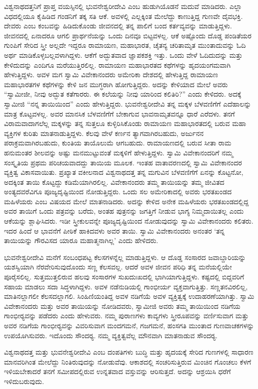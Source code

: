 ವಿಶ್ವನಾಥದತ್ತನಿಗೆ ಪ್ರಾಪ್ತ ವಯಸ್ಸಿನಲ್ಲಿ ಭುವನೇಶ್ವರೀದೇವಿ ಎಂಬ ಹುಡುಗಿಯೊಡನೆ ಮದುವೆ ಮಾಡಿದರು. ಎಲ್ಲಾ ವಿಧದಲ್ಲಿಯೂ ಕೈಹಿಡಿದ ಗಂಡನಿಗೆ ತಕ್ಕ ಸತಿ ಆಕೆ. ಅವಳಲ್ಲಿ ಎಲ್ಲಕ್ಕಿಂತ ಮೇಲೆದ್ದು ಕಾಣುತ್ತಿದ್ದ ಗುಣವೇ ದೈವಭಕ್ತಿ. ದೇವರು ಎಂಬ ಕಂಬವನ್ನು ಹಿಡಿದುಕೊಂಡು ಜೀವನದಲ್ಲಿ ತನ್ನ ಪಾಲಿಗೆ ಬಂದ ಕರ್ತವ್ಯವನ್ನು ಮಾಡುತ್ತಿದ್ದಳು. ಜೀವನದಲ್ಲಿ ಏನಾದರೂ ಆಗಲಿ ಪ್ರಾರ್ಥನೆಯನ್ನು ಒಂದು ದಿನವೂ ಬಿಟ್ಟವಳಲ್ಲ. ಆಕೆ ಅಷ್ಟೊಂದು ದೊಡ್ಡ ಪಂಡಿತೆಯರ ಗುಂಪಿಗೆ ಸೇರಿದ ಸ್ತ್ರೀ ಅಲ್ಲದೇ ಇದ್ದರೂ ರಾಮಾಯಣ, ಮಹಾಭಾರತ, ಚೈತನ್ಯ ಚರಿತಾಮೃತ ಮುಂತಾದುವನ್ನು ಓದಿ ಅರ್ಥ ಮಾಡಿಕೊಳ್ಳಬಲ್ಲವಳಾಗಿದ್ದಳು. ಆಕೆಗೆ ಅದ್ಭುತವಾದ ಜ್ಞಾಪಕಶಕ್ತಿ ಇತ್ತು. ಒಂದು ವೇಳೆ ಓದಿದುದನ್ನು ಮತ್ತು ಕೇಳಿದುದನ್ನು ಎಂದಿಗೂ ಮರೆಯುತ್ತಿರಲಿಲ್ಲ. ರಾಮಾಯಣ ಮಹಾಭಾರತದ ಕಥೆಗಳನ್ನು ಹೃದಯಂಗಮವಾಗಿ ಹೇಳುತ್ತಿದ್ದಳು. ಅವಳ ಮಗ ಸ್ವಾಮಿ ವಿವೇಕಾನಂದರು ಅಮೇರಿಕಾ ದೇಶದಲ್ಲಿ ಹೇಳುತ್ತಿದ್ದ ರಾಮಾಯಣ ಮಹಾಭಾರತಗಳ ಕಥೆಗಳನ್ನು ಕೇಳಿ ಜನ ಮುಗ್ಧರಾಗಿ ಹೋಗುತ್ತಿದ್ದರು. ಅದನ್ನು ಕೇಳಿಯಾದ ಮೇಲೆ ಅವರು “ಸ್ವಾಮೀಜೀ, ನೀವು ಅದ್ಭುತ ಕತೆಗಾರರು. ಈ ಕಲೆಯನ್ನು ನೀವು ಯಾರಿಂದ ಕಲಿತಿರಿ?” ಎಂದು ಕೇಳಿದರು. ಅದಕ್ಕೆ ಸ್ವಾಮೀಜಿ “ನನ್ನ ತಾಯಿಯಿಂದ” ಎಂದು ಹೇಳುತ್ತಿದ್ದರು. ಭುವನೇಶ್ವರೀದೇವಿ ತನ್ನ ಮಕ್ಕಳ ಬೆಳವಣಿಗೆಗೆ ಎದೆಹಾಲನ್ನು ಮಾತ್ರ ಕೊಟ್ಟವಳಲ್ಲ. ಅವರ ಮಾನಸಿಕ ಬೆಳವಣಿಗೆಗೆ ಬೇಕಾಗುವ ಭಾವನಾಮೃತವನ್ನೂ ಧಾರೆ ಎರೆದಳು. ತನಗೆ ವಿರಾಮವಾದಾಗಲೆಲ್ಲ ಮಕ್ಕಳನ್ನು ತನ್ನ ಸುತ್ತಲೂ ಕುಳ್ಳಿರಿಸಿಕೊಂಡು ರಾಮಾಯಣ ಮಹಾಭಾರತದಲ್ಲಿ ಬರುವ ಮಹಾ ವ್ಯಕ್ತಿಗಳ ಕುರಿತು ಮಾತನಾಡುತ್ತಿದ್ದಳು. ಕೆಲವು ವೇಳೆ ಕರ್ಣನ ತ್ಯಾಗವಾಗಿರಬಹುದು, ಅರ್ಜುನನ ಪರಾಕ್ರಮವಾಗಿರಬಹುದು, ಕುಂತಿಯ ತಾಯೊಲುಮೆ ಆಗಬಹುದು. ರಾಮಾಯಣದಲ್ಲಿ ಬರುವ ಸೀತಾ ರಾಮ ಹನುಮಂತರ ಶೀಲವನ್ನು ಅಷ್ಟು ಮನಮುಟ್ಟುವಂತೆ ಮಕ್ಕಳಿಗೆ ಹೇಳುತ್ತಿದ್ದಳು. ಸ್ವಾಮಿ ವಿವೇಕಾನಂದರಿಗೆ ನಮ್ಮ ಸಂಸ್ಕೃತಿಯ ಪ್ರಥಮ ಪರಿಚಯವಾದದ್ದು ತಾಯಿಯ ಮೂಲಕ. ಇಂತಹ ವಾತಾವರಣದಲ್ಲಿ ಸ್ವಾಮಿ ವಿವೇಕಾನಂದರ ವ್ಯಕ್ತಿತ್ವ ವಿಕಾಸವಾಯಿತು. ಪ್ರಖ್ಯಾತ ವಕೀಲನಾದ ವಿಶ್ವನಾಥದತ್ತ ತನ್ನ ಮಗುವಿನ ಬೆಳವಣಿಗೆಗೆ ಏನನ್ನು ಕೊಟ್ಟನೋ, ಅದಕ್ಕಿಂತ ತಾಯಿ ಕೊಟ್ಟದ್ದು ಕಡಿಮೆಯಾಗಿರಲಿಲ್ಲ. ವಿವೇಕಾನಂದರು ತಮ್ಮ ತಾಯಿಯನ್ನು ತಮ್ಮ ಜೀವಿತದ ಅಂತ್ಯದವರೆವಿಗೂ ಪೂಜ್ಯದೃಷ್ಟಿಯಿಂದ ನೋಡುತ್ತಿದ್ದರು. ಒಂದು ಸಲ ಅಮೇರಿಕಾದಲ್ಲಿ ಅವರು ಭರತಖಂಡದ ಮಹಿಳೆಯರು ಎಂಬ ವಿಷಯದ ಮೇಲೆ ಮಾತನಾಡಿದರು. ಅದನ್ನು ಕೇಳಿದ ಅನೇಕ ಮಹಿಳೆಯರು ಭರತಖಂಡದಲ್ಲಿದ್ದ ಅವರ ತಾಯಿಗೆ ಒಂದು ಪತ್ರವನ್ನು ಬರೆದು, ಅಂತಹ ಪುತ್ರನನ್ನು ಜಗತ್ತಿಗೆ ನೀಡುವ ಭಾಗ್ಯ ನಿಮ್ಮದಾಯಿತಲ್ಲ ಎಂದು ಆಕೆಯನ್ನು ಶ್ಲಾಘಿಸಿದರು. ಇಡೀ ಸ್ತ್ರೀಕುಲವನ್ನೇ ಪೂಜ್ಯದೃಷ್ಟಿಯಿಂದ ನೋಡುವುದನ್ನು ಸ್ವಾಮಿ ವಿವೇಕಾನಂದರು ಕಲಿತರು. ಇದರ ಹಿಂದೆ ಆ ಭಾವನೆಗೆ ಪೀಠಿಕೆ ಹಾಕಿದವಳು ಅವರ ತಾಯಿ. ಸ್ವಾಮಿ ವಿವೇಕಾನಂದರು ಅನಂತರ ‘ತನ್ನ ತಾಯಿಯನ್ನು ಗೌರವಿಸದ ಯಾರೂ ಮಹಾತ್ಮನಾಗಿಲ್ಲ’ ಎಂದು ಹೇಳಿದರು.

ಭುವನೇಶ್ವರೀದೇವಿ ಮನೆಗೆ ಸಂಬಂಧಪಟ್ಟ ಕೆಲಸಗಳನ್ನೆಲ್ಲ ಮಾಡುತ್ತಿದ್ದಳು. ಆ ದೊಡ್ಡ ಸಂಸಾರದ ಜವಾಬ್ದಾರಿಯನ್ನು ಯಶಸ್ವಿಯಾಗಿ ನೆರವೇರಿಸುವುದೊಂದು ಸಣ್ಣ ಕೆಲಸವಲ್ಲ. ಆದರೆ ಅವಳ ಜೀವನ ಪರಿಧಿ ತನ್ನ ಮನೆಯಲ್ಲಿಯೇ ಪೂರೈಸಲಿಲ್ಲ. ಸುತ್ತಮುತ್ತಲಿರುವ ಹಲವು ಸಂಸಾರಗಳ ಸುಖದುಃಖದಲ್ಲಿ ಭಾಗಿಯಾಗುತ್ತಿದ್ದಳು. ಕಷ್ಟದಲ್ಲಿ ಬಿದ್ದವರಿಗೆ ಸಹಾಯ ಮಾಡಲು ಸದಾ ಸಿದ್ಧಳಾಗಿದ್ದಳು. ಅವಳ ನಡೆನುಡಿಯಲ್ಲಿ ಗಾಂಭೀರ್ಯ ವ್ಯಕ್ತವಾಗುತ್ತಿತ್ತು. ಸಣ್ಣತನವಿರಲಿಲ್ಲ, ಮಾತಿನಲ್ಲಾಗಲೀ ಕೆಲಸದಲ್ಲಾಗಲಿ. ಸಿಂಹಿಣಿಯಂತಿದ್ದ ಅವಳ ನಡಿಗೆಯೆ ಅವಳ ವ್ಯಕ್ತಿತ್ವಕ್ಕೆ ಉದಾಹರಣೆಯಾಗಿತ್ತು. ಸ್ವಾಮಿ ವಿವೇಕಾನಂದರು ಮತ್ತು ಅವರ ತಾಯಿಯನ್ನು ನೋಡಿದವರು, ಸ್ವಾಮೀಜಿ ಅವರು ತಮ್ಮ ತಾಯಿಯಿಂದ ನಡಿಗೆಯ ಗಾಂಭೀರ‍್ಯವನ್ನು ಪಡೆದರು ಎಂದು ಹೇಳುವರು. ನಮ್ಮ ಪುರಾಣಗಳು ಕಾವ್ಯಗಳು ಸ್ತ್ರೀರೂಪವನ್ನು ವರ್ಣಿಸುವಾಗ ಮತ್ತು ಅವರ ನಡಿಗೆಯ ಗಾಂಭೀರ‍್ಯವನ್ನು ವಿವರಿಸುವಾಗ ಮಂದಗಮನೆ, ಗಜಗಮನೆ, ಹಂಸಗತಿ ಮುಂತಾದ ಗುಣವಾಚಕಗಳನ್ನು ಉಪಯೊಗಿಸುವರು. ಇದೊಂದು ಸೌಂದರ‍್ಯ. ನಮ್ಮ ವ್ಯಕ್ತಿತ್ವವೆಲ್ಲ ಮೌನವಾಗಿ ಮಾತನಾಡುವ ಸೌಂದರ‍್ಯ. 

ವಿಶ್ವನಾಥದತ್ತ ಮತ್ತು ಭುವನೇಶ್ವರೀದೇವಿ ಎಂಬ ದಂಪತಿಗಳು ಬುದ್ಧಿ ಮತ್ತು ಹೃದಯಕ್ಕೆ ಸೇರಿದ ಗುಣಗಳಲ್ಲಿ ಸಾಧಾರಣ ಮಾನವರಿಗಿಂತ ಮೇಲೆದ್ದು ನಿಂತಿರುವುದನ್ನು ನೋಡುವೆವು. ಆಕಾಶದಲ್ಲಿ ಸಂಚರಿಸುತ್ತಿರುವ ಮಿಂಚಿನ ಗೊಂಚಲು ಕೆಳಗೆ ಇಳಿಯಬೇಕಾದರೆ ತನಗೆ ಸಮೀಪದಲ್ಲಿರುವ ಉನ್ನತವಾದ ವಸ್ತುವನ್ನು ಆರಿಸುತ್ತದೆ. ಅದನ್ನು ಆಶ್ರಯಿಸಿ ಧರೆಗೆ ಇಳಿದುಬರುವುದು. 

